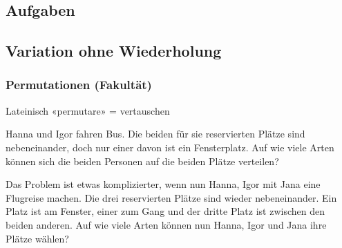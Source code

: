 \subsection*{Aufgaben}



\newpage

\subsection{Variation ohne Wiederholung}\label{kombiVariationOhneWiederholung}
\subsubsection{Permutationen (Fakultät)}

Lateinisch «permutare» = vertauschen



Hanna und Igor fahren Bus. Die beiden für sie reservierten Plätze sind
nebeneinander, doch nur einer davon ist ein Fensterplatz. Auf wie
viele Arten können sich die beiden Personen auf die beiden Plätze
verteilen?


Das Problem ist etwas komplizierter, wenn nun Hanna, Igor mit Jana
eine Flugreise machen. Die drei reservierten Plätze sind wieder
nebeneinander. Ein Platz ist am Fenster, einer zum Gang und der dritte
Platz ist zwischen den beiden anderen. Auf wie viele Arten können nun
Hanna, Igor und Jana ihre Plätze wählen?


